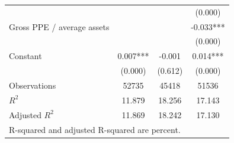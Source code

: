 {\begin{tabular}{l*{3}{c}}
                    &               &               &     (0.000)   \\
Gross PPE / average assets&               &               &      -0.033***\\
                    &               &               &     (0.000)   \\
Constant            &       0.007***&      -0.001   &       0.014***\\
                    &     (0.000)   &     (0.612)   &     (0.000)   \\
\hline
Observations        &       52735   &       45418   &       51536   \\
\(R^{2}\)           &      11.879   &      18.256   &      17.143   \\
Adjusted \(R^{2}\)  &      11.869   &      18.242   &      17.130   \\
\hline\hline
\multicolumn{4}{l}{\footnotesize R-squared and adjusted R-squared are percent.}\\
\end{tabular}
}
